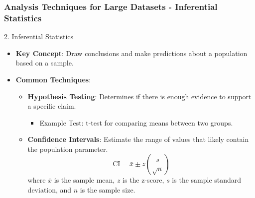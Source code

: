 \documentclass[aspectratio=169]{beamer}
\begin{document}
\begin{frame}[fragile]
    \frametitle{Analysis Techniques for Large Datasets - Inferential Statistics}
    \begin{block}{2. Inferential Statistics}
        \begin{itemize}
            \item \textbf{Key Concept}: Draw conclusions and make predictions about a population based on a sample.
            \item \textbf{Common Techniques}:
            \begin{itemize}
                \item \textbf{Hypothesis Testing}: Determines if there is enough evidence to support a specific claim.
                \begin{itemize}
                    \item Example Test: t-test for comparing means between two groups.
                \end{itemize}
                \item \textbf{Confidence Intervals}: Estimate the range of values that likely contain the population parameter.
                \begin{equation}
                    \text{CI} = \bar{x} \pm z\left(\frac{s}{\sqrt{n}}\right)
                \end{equation}
                where \( \bar{x} \) is the sample mean, \( z \) is the z-score, \( s \) is the sample standard deviation, and \( n \) is the sample size.
            \end{itemize}
        \end{itemize}
    \end{block}
\end{frame}
\end{document}
